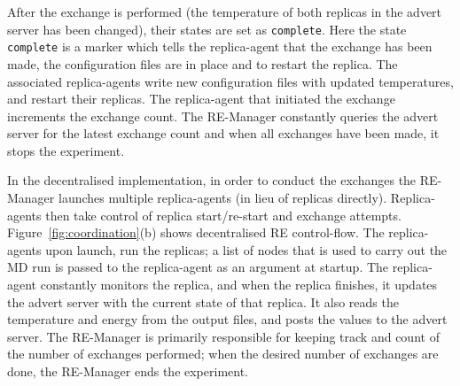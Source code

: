 \documentclass{rspublic}
\newcommand{\jhanote}[1]{ {\textcolor{red} { ***shantenu: #1 }}}
\newcommand{\athotanote}[1]{ {\textcolor{green} { ***athota: #1 }}}
\newcommand{\athotanote}[1]{}
\newcommand{\jhanote}[1]{}
\begin{document}


After the exchange is performed (the temperature of both replicas in
the advert server has been changed), their states are set as
\texttt{complete}. Here the state \texttt{complete} is a marker
which tells the replica-agent that the exchange has been made, the
configuration files are in place and to restart the replica.  
The associated replica-agents write new
configuration files with updated temperatures, and restart their
replicas. The replica-agent that initiated the exchange increments the
exchange count. The RE-Manager constantly queries the advert server
for the latest exchange count and when all exchanges have been made,
it stops the experiment.

In the decentralised implementation, in order to conduct the exchanges
the RE-Manager launches multiple replica-agents (in lieu of replicas
directly).  Replica-agents then take control of replica start/re-start
and exchange attempts.  Figure~\ref{fig:coordination}(b) shows
decentralised RE control-flow. The replica-agents upon launch, run the
replicas; a list of nodes that is used to carry out the MD run is
passed to the replica-agent as an argument at startup.  The
replica-agent constantly monitors the replica, and when the replica
finishes, it updates the advert server with the current state of that
replica.  It also reads the temperature and energy from the output
files, and posts the values to the advert server.  The RE-Manager is
primarily responsible for keeping track and count of the number of
exchanges performed; when the desired number of exchanges are done,
the RE-Manager ends the experiment.
\end{document}

